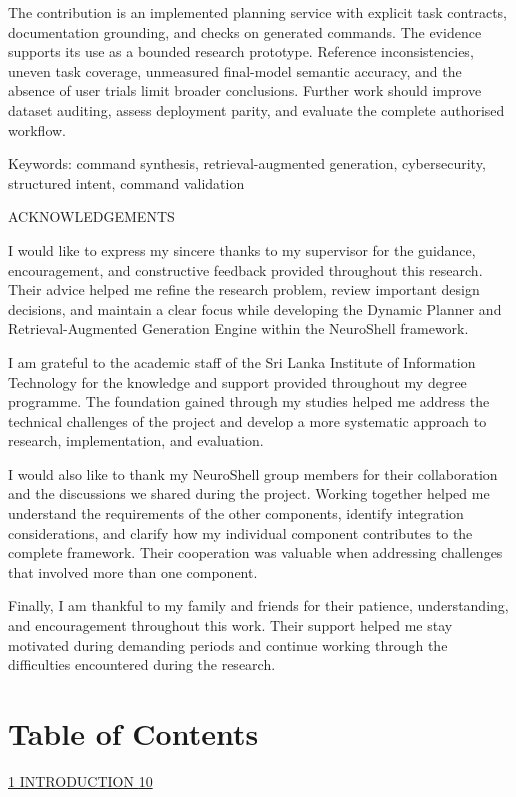 \documentclass[
]{article}
\begin{document}
The contribution is an implemented planning service with explicit task
contracts, documentation grounding, and checks on generated commands.
The evidence supports its use as a bounded research prototype. Reference
inconsistencies, uneven task coverage, unmeasured final-model semantic
accuracy, and the absence of user trials limit broader conclusions.
Further work should improve dataset auditing, assess deployment parity,
and evaluate the complete authorised workflow.

Keywords: command synthesis, retrieval-augmented generation,
cybersecurity, structured intent, command validation

ACKNOWLEDGEMENTS

I would like to express my sincere thanks to my supervisor for the
guidance, encouragement, and constructive feedback provided throughout
this research. Their advice helped me refine the research problem,
review important design decisions, and maintain a clear focus while
developing the Dynamic Planner and Retrieval-Augmented Generation Engine
within the NeuroShell framework.

I am grateful to the academic staff of the Sri Lanka Institute of
Information Technology for the knowledge and support provided throughout
my degree programme. The foundation gained through my studies helped me
address the technical challenges of the project and develop a more
systematic approach to research, implementation, and evaluation.

I would also like to thank my NeuroShell group members for their
collaboration and the discussions we shared during the project. Working
together helped me understand the requirements of the other components,
identify integration considerations, and clarify how my individual
component contributes to the complete framework. Their cooperation was
valuable when addressing challenges that involved more than one
component.

Finally, I am thankful to my family and friends for their patience,
understanding, and encouragement throughout this work. Their support
helped me stay motivated during demanding periods and continue working
through the difficulties encountered during the research.

\hypertarget{table-of-contents}{%
\section{Table of Contents}\label{table-of-contents}}

\protect\hyperlink{introduction}{1 INTRODUCTION
\protect\hyperlink{introduction}{10}}
\end{document}
